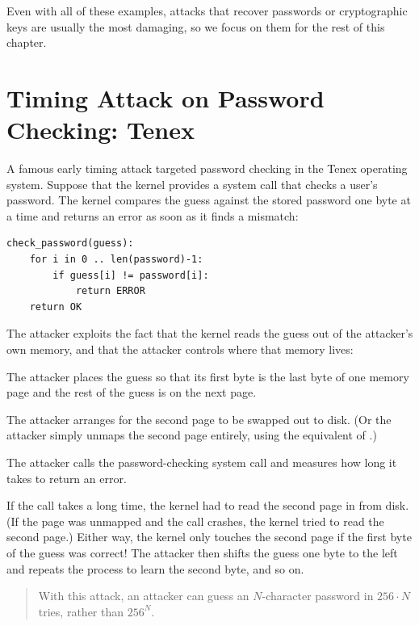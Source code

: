 Even with all of these examples, attacks that recover passwords or
cryptographic keys are usually the most damaging, so we focus on them
for the rest of this chapter.

\section{Timing Attack on Password Checking: Tenex}
\label{sec:sc:tenex}

A famous early timing attack targeted password checking in the Tenex
operating system.
Suppose that the kernel provides a system call that checks a user's
password.
The kernel compares the guess against the stored password one byte at
a time and returns an error as soon as it finds a mismatch:
\begin{lstlisting}
check_password(guess):
    for i in 0 .. len(password)-1:
        if guess[i] != password[i]:
            return ERROR
    return OK
\end{lstlisting}

The attacker exploits the fact that the kernel reads the guess out of
the attacker's own memory, and that the attacker controls where that
memory lives:
\begin{compactenum}
  \item The attacker places the guess so that its first byte is the last
        byte of one memory page and the rest of the guess is on the
        next page.
  \item The attacker arranges for the second page to be swapped out to
        disk.
        (Or the attacker simply unmaps the second page entirely, using
        the equivalent of .)
  \item The attacker calls the password-checking system call and
        measures how long it takes to return an error.
\end{compactenum}
If the call takes a long time, the kernel had to read the second page
in from disk.
(If the page was unmapped and the call crashes, the kernel tried to read
the second page.)
Either way, the kernel only touches the second page if the first byte of
the guess was correct!
The attacker then shifts the guess one byte to the left and repeats the
process to learn the second byte, and so on.

\begin{quote}
  With this attack, an attacker can guess an $N$-character password in
  $256 \cdot N$ tries, rather than $256^N$.
\end{quote}

